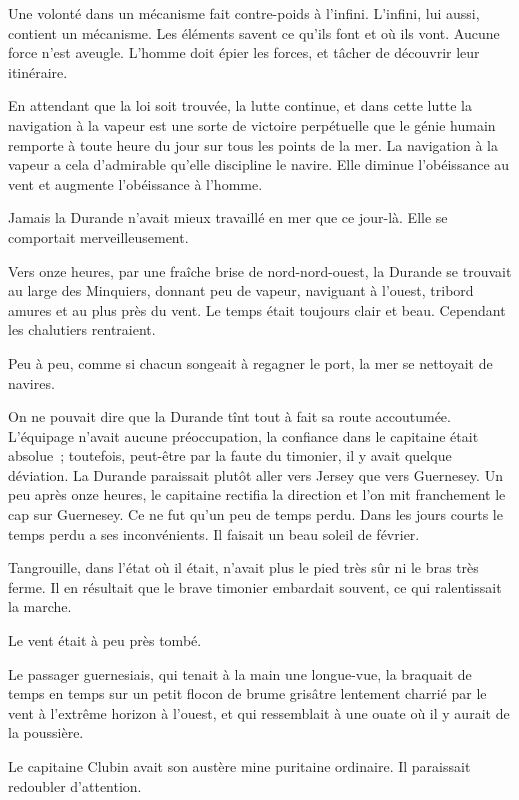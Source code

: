 \documentclass[french,twoside]{book} %
\begin{document}
Une volonté dans un mécanisme fait contre-poids à l’infini. L’infini, lui aussi, contient un mécanisme. Les éléments savent ce qu’ils font et où ils vont. Aucune force n’est aveugle. L’homme doit épier les forces, et tâcher de découvrir leur itinéraire.\par
 En attendant que la loi soit trouvée, la lutte continue, et dans cette lutte la navigation à la vapeur est une sorte de victoire perpétuelle que le génie humain remporte à toute heure du jour sur tous les points de la mer. La navigation à la vapeur a cela d’admirable qu’elle discipline le navire. Elle diminue l’obéissance au vent et augmente l’obéissance à l’homme.\par
Jamais la Durande n’avait mieux travaillé en mer que ce jour-là. Elle se comportait merveilleusement.\par
Vers onze heures, par une fraîche brise de nord-nord-ouest, la Durande se trouvait au large des Minquiers, donnant peu de vapeur, naviguant à l’ouest, tribord amures et au plus près du vent. Le temps était toujours clair et beau. Cependant les chalutiers rentraient.\par
Peu à peu, comme si chacun songeait à regagner le port, la mer se nettoyait de navires.\par
On ne pouvait dire que la Durande tînt tout à fait sa route accoutumée. L’équipage n’avait aucune préoccupation, la confiance dans le capitaine était absolue ; toutefois, peut-être par la faute du timonier, il y avait quelque déviation. La Durande paraissait plutôt aller vers Jersey que vers Guernesey. Un peu après onze heures, le capitaine rectifia la direction et l’on mit franchement le cap sur Guernesey. Ce ne fut qu’un peu de temps perdu. Dans les jours courts le temps perdu a ses inconvénients. Il faisait un beau soleil de février.\par
Tangrouille, dans l’état où il était, n’avait plus le pied très sûr ni le bras très ferme. Il en résultait que  le brave timonier embardait souvent, ce qui ralentissait la marche.\par
Le vent était à peu près tombé.\par
Le passager guernesiais, qui tenait à la main une longue-vue, la braquait de temps en temps sur un petit flocon de brume grisâtre lentement charrié par le vent à l’extrême horizon à l’ouest, et qui ressemblait à une ouate où il y aurait de la poussière.\par
Le capitaine Clubin avait son austère mine puritaine ordinaire. Il paraissait redoubler d’attention.\par
\end{document}

